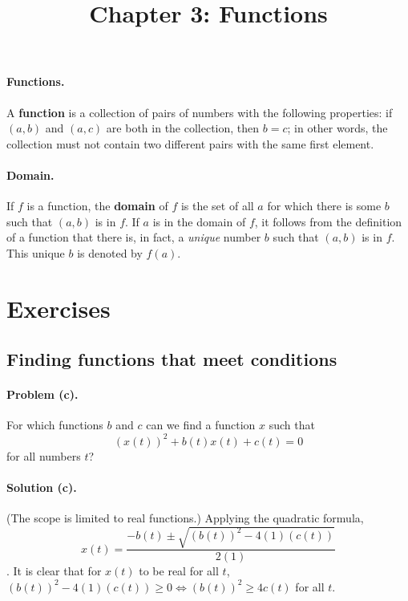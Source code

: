 \documentclass{article}
\begin{document}
\title{Chapter 3: Functions}
\maketitle

\paragraph{Functions.} A \textbf{function} is a collection of pairs of numbers with the following properties: if $(a, b)$ and $(a, c)$ are both in the collection, then $b = c$; in other words, the collection must not contain two different pairs with the same first element.

\paragraph{Domain.} If $f$ is a function, the \textbf{domain} of $f$ is the set of all $a$ for which there is some $b$ such that $(a, b)$ is in $f$. If $a$ is in the domain of $f$, it follows from the definition of a function that there is, in fact, a \emph{unique} number $b$ such that $(a, b)$ is in $f$. This unique $b$ is denoted by $f(a)$.

\section{Exercises}

\setcounter{subsection}{9}
\subsection{Finding functions that meet conditions}

\paragraph{Problem (c).} For which functions $b$ and $c$ can we find a function $x$ such that \begin{equation*}
  (x(t))^2 + b(t)x(t) + c(t) = 0
\end{equation*} for all numbers $t$?

\paragraph{Solution (c).} (The scope is limited to real functions.) Applying the quadratic formula, \begin{equation*}
  x(t) = \frac{-b(t) \pm \sqrt{(b(t))^2 - 4(1)(c(t))}}{2(1)}
\end{equation*}. It is clear that for $x(t)$ to be real for all $t$, $(b(t))^2 - 4(1)(c(t)) \geq 0 \iff (b(t))^2 \geq 4c(t)$ for all $t$.
\end{document}
